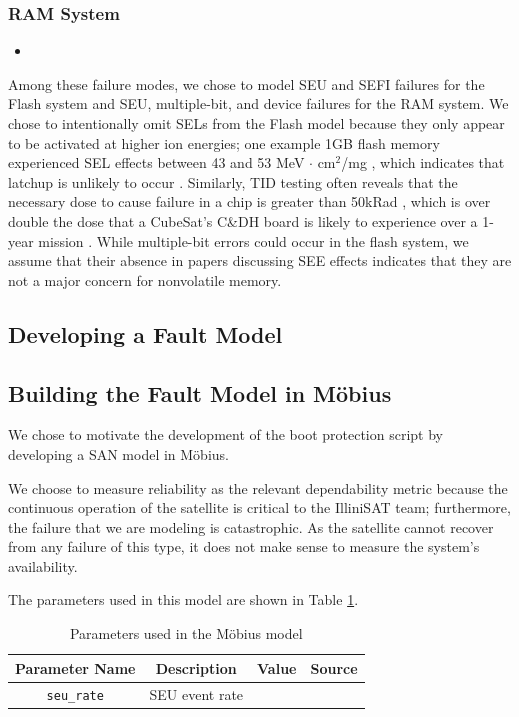 \subsubsection{RAM System}\label{sec:rammodel}
\begin{itemize}
\item
\end{itemize}

Among these failure modes, we chose to model SEU and SEFI failures for the Flash system and SEU, multiple-bit, and device failures for the RAM system.  We chose to intentionally omit SELs from the Flash model because they only appear to be activated at higher ion energies; one example 1GB flash memory experienced SEL effects between 43 and 53 MeV $\cdot$ cm$^2$/mg \cite{Langley2004SEE}, which indicates that latchup is unlikely to occur \cite{Schwank2013Radiation}.  Similarly, TID testing often reveals that the necessary dose to cause failure in a chip is greater than 50kRad \cite{Oldman2008TID}, which is over double the dose that a CubeSat's C\&DH board is likely to experience over a 1-year mission \cite{Likar2010Novel}.  While multiple-bit errors could occur in the flash system, we assume that their absence in papers discussing SEE effects indicates that they are not a major concern for nonvolatile memory.

\subsection{Developing a Fault Model}\label{sec:developingmodel}



\subsection{Building the Fault Model in M\"obius}\label{sec:buildingmodel}

We chose to motivate the development of the boot protection script by developing a SAN model in M\"obius.

We choose to measure reliability as the relevant dependability metric because the continuous operation of the satellite is critical to the IlliniSAT team; furthermore, the failure that we are modeling is catastrophic.  As the satellite cannot recover from any failure of this type, it does not make sense to measure the system's availability.

The parameters used in this model are shown in Table \ref{tab:parameters}.

\begin{table}[width = 0.5\textwidth]
\centering
\begin{tabular}{|c|c|c|c|}
\hline
{\bf Parameter Name} & {\bf Description} & {\bf Value} & {\bf Source}\\
\hline
\texttt{seu\_rate} & SEU event rate & & \\
\hline
\end{tabular}
\caption{Parameters used in the M\"obius model}
\label{tab:parameters}
\end{table}
